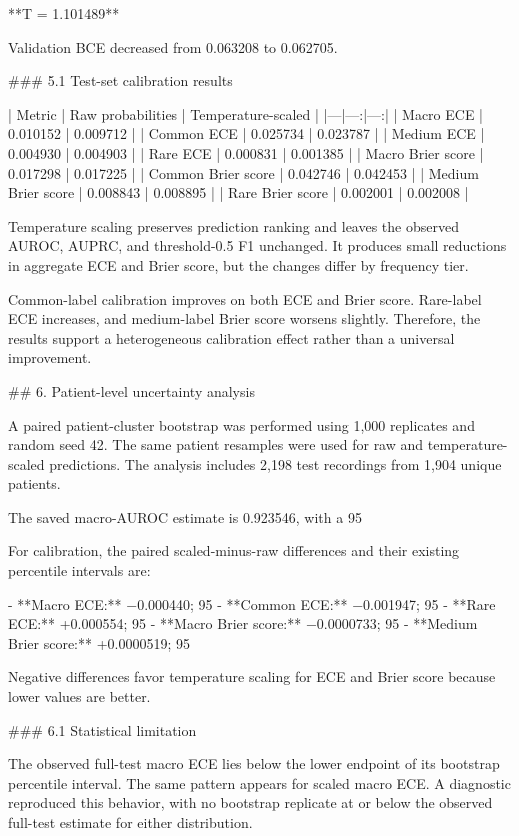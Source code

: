 **T = 1.101489**

Validation BCE decreased from 0.063208 to 0.062705.

### 5.1 Test-set calibration results

| Metric | Raw probabilities | Temperature-scaled |
|---|---:|---:|
| Macro ECE | 0.010152 | 0.009712 |
| Common ECE | 0.025734 | 0.023787 |
| Medium ECE | 0.004930 | 0.004903 |
| Rare ECE | 0.000831 | 0.001385 |
| Macro Brier score | 0.017298 | 0.017225 |
| Common Brier score | 0.042746 | 0.042453 |
| Medium Brier score | 0.008843 | 0.008895 |
| Rare Brier score | 0.002001 | 0.002008 |

Temperature scaling preserves prediction ranking and leaves the observed AUROC, AUPRC, and threshold-0.5 F1 unchanged. It produces small reductions in aggregate ECE and Brier score, but the changes differ by frequency tier.

Common-label calibration improves on both ECE and Brier score. Rare-label ECE increases, and medium-label Brier score worsens slightly. Therefore, the results support a heterogeneous calibration effect rather than a universal improvement.

## 6. Patient-level uncertainty analysis

A paired patient-cluster bootstrap was performed using 1,000 replicates and random seed 42. The same patient resamples were used for raw and temperature-scaled predictions. The analysis includes 2,198 test recordings from 1,904 unique patients.

The saved macro-AUROC estimate is 0.923546, with a 95%

For calibration, the paired scaled-minus-raw differences and their existing percentile intervals are:

- **Macro ECE:** −0.000440; 95%
- **Common ECE:** −0.001947; 95%
- **Rare ECE:** +0.000554; 95%
- **Macro Brier score:** −0.0000733; 95%
- **Medium Brier score:** +0.0000519; 95%

Negative differences favor temperature scaling for ECE and Brier score because lower values are better.

### 6.1 Statistical limitation

The observed full-test macro ECE lies below the lower endpoint of its bootstrap percentile interval. The same pattern appears for scaled macro ECE. A diagnostic reproduced this behavior, with no bootstrap replicate at or below the observed full-test estimate for either distribution.

